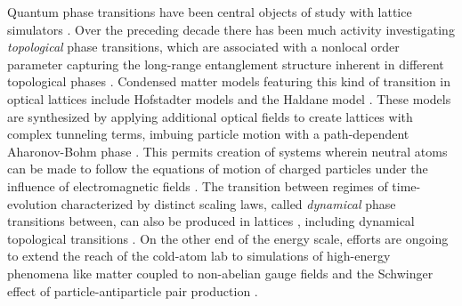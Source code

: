 	Quantum phase transitions have been central objects of study with lattice simulators \cite{Greiner01,Eckardt05,Jordens08,Baumann10,Endres12,Haller10,Leonard17,Landig16,SachdevQPT}.
	Over the preceding decade there has been much activity investigating \emph{topological} phase transitions, which are associated with a nonlocal order parameter capturing the long-range entanglement structure inherent in different topological phases \cite{Goldman16,Nakagawa14}.
	Condensed matter models featuring this kind of transition in optical lattices include Hofstadter models\cite{Aidelsburger13,Tai17,Miyake13} and the Haldane model \cite{Jotzu14}.
	These models are synthesized by applying additional optical fields to create lattices with complex tunneling terms, imbuing particle motion with a path-dependent Aharonov-Bohm phase \cite{Aidelsburger11,Aidelsburger13,Miyake13}.
	This permits creation of systems wherein neutral atoms can be made to follow the equations of motion of charged particles under the influence of electromagnetic fields \cite{Aidelsburger13,Tai17,Endres11,Rispoli19,Jo09,Simon11,Miyake13,Folling07,Jotzu14}.
	The transition between regimes of time-evolution characterized by distinct scaling laws, called \emph{dynamical} phase transitions between, can also be produced in lattices \cite{Clark16}, including dynamical topological transitions \cite{Nakagawa14}.
	On the other end of the energy scale, efforts are ongoing to extend the reach of the cold-atom lab to simulations of high-energy phenomena like matter coupled to non-abelian gauge fields \cite{Zohar16,Schweizer19,Tagliacozzo13} and the Schwinger effect of particle-antiparticle pair production \cite{Pineiro19}.	
	

